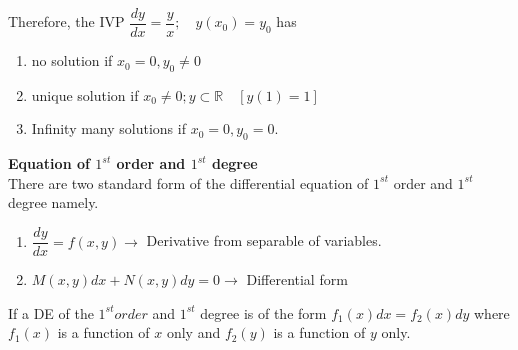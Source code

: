 \documentclass[a4aper,12pt]{report}
\begin{document}
\noindent Therefore, the IVP $\dfrac{dy}{dx} = \dfrac{y}{x}; \quad y(x_0) = y_0$ has
\begin{enumerate}
    \item no solution if $x_0 = 0, y_0 \neq 0$ 
    \item unique solution if $x_0 \neq 0; y \subset \mathbb{R} \quad [y(1)=1]$
    \item Infinity many solutions if $x_0 =0, y_0 = 0$.
\end{enumerate}
\textbf{\large Equation of $1^{st}$ order and $1^{st}$ degree} \\ [5pt]
There are two standard form of the differential equation of $1^{st}$ order and $1^{st}$ degree namely.
\begin{enumerate}
    \item $\dfrac{dy}{dx}=f(x,y) \longrightarrow$ Derivative from separable of variables. 
    \item $M(x,y)dx+N(x,y)dy=0 \longrightarrow $ Differential form  
\end{enumerate}
If a DE of the $1^{st} order$ and $1^{st}$ degree is of the form $f_1(x)dx = f_2(x)dy
$ where $f_1(x)$ is a function of $x$ only and $f_2(y)$ is a function of $y$ only. 

\end{document}
